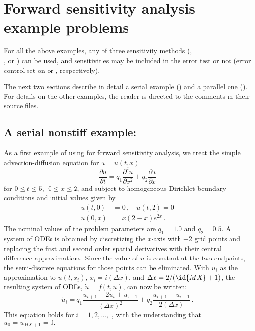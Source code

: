 \section{Forward sensitivity analysis example problems}\label{s:fwd_ex}

For all the above examples, any of three sensitivity methods (, \\
, or ) can be used, and sensitivities may be 
included in the error test or not (error control set on  or ,
respectively).

The next two sections describe in detail a serial example () and
a parallel one (). For details on the other examples, the reader is
directed to the comments in their source files.

\subsection{A serial nonstiff example: }
\label{ss:cvfnx}

As a first example of using {\cvodes} for forward sensitivity analysis,
we treat the simple advection-diffusion equation
for $u=u(t,x)$
\begin{equation}\label{e:cvfnx_PDE}
  \frac{\partial u}{\partial t}= q_1 \frac{\partial ^{2}u}{\partial x^{2}}
  + q_2 \frac{\partial u}{\partial x}
\end{equation}
for $0 \leq t \leq 5, ~~ 0\leq x \leq 2$, and subject to homogeneous
Dirichlet boundary conditions and initial values given by 
\begin{equation}\label{e:cvfnx_BC_IC}
  \begin{split}
    u(t,0) &= 0 \, , \quad u(t,2) = 0 \\
    u(0,x) &= x(2-x)e^{2x} \, .
  \end{split}
\end{equation}
The nominal values of the problem parameters are $q_1 = 1.0$ and $q_2 = 0.5$.
A system of  ODEs is obtained by discretizing the $x$-axis with +2
grid points and replacing the first and second order spatial derivatives
with their central difference approximations. Since the value of $u$ is
constant at the two endpoints, the semi-discrete equations for those points
can be eliminated.  With $u_{i}$ as the approximation to $u(t,x_{i})$, 
$x_{i} = i(\Delta x)$, and $\Delta x=2/(\id{MX}+1)$, the resulting system of
ODEs, ${\dot u} = f(t,u)$, can now be written:
\begin{equation}\label{e:cvfnx_ODE}
  {\dot u}_i= q_1 \frac{u_{i+1}-2u_{i}+u_{i-1}}{(\Delta x)^{2}}
  + q_2 \frac{u_{i+1}-u_{i-1}}{2(\Delta x)} \, .
\end{equation}
This equation holds for $i=1,2,\ldots ,$ , with the understanding
that $u_{0} = u_{MX+1}=0.$

